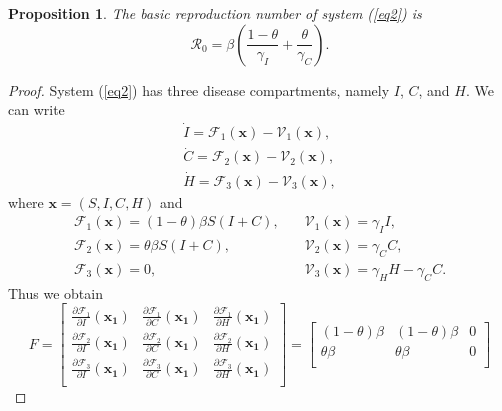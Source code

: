 \documentclass[11pt,reqno]{amsart}
\newtheorem{proposition}{Proposition}
\theoremstyle{boldremark}
\begin{document}
\begin{proposition} \label{prop1}
    The basic reproduction number of system (\ref{eq2}) is 
    \begin{equation*}
        \mathcal{R}_0=\beta\left(\frac{1-\theta}{\gamma_I}+\frac{\theta}{\gamma_C}\right). 
    \end{equation*}
\end{proposition}
\begin{proof}
    System (\ref{eq2}) has three disease compartments, namely $I$, $C$, and $H$. We can write 
    \begin{align*}
        \dot{I} = \mathcal{F}_1(\mathbf{x})-\mathcal{V}_1(\mathbf{x}), \\ 
        \dot{C} = \mathcal{F}_2(\mathbf{x})-\mathcal{V}_2(\mathbf{x}), \\ 
        \dot{H} = \mathcal{F}_3(\mathbf{x})-\mathcal{V}_3(\mathbf{x}),  
    \end{align*}
    where $\mathbf{x}=(S,I,C,H)$ and 
    \begin{align*}
        \mathcal{F}_1(\mathbf{x}) = (1-\theta)\beta S (I+C),& \quad \mathcal{V}_1(\mathbf{x})=\gamma_I I, \\ 
        \mathcal{F}_2(\mathbf{x}) = \theta\beta S (I+C),& \quad \mathcal{V}_2(\mathbf{x})=\gamma_C C, \\
        \mathcal{F}_3(\mathbf{x}) = 0,& \quad \mathcal{V}_3(\mathbf{x})=\gamma_H H - \gamma_C C. 
    \end{align*}
    Thus we obtain 
    \begin{equation*}
    F = 
    \begin{bmatrix}
    \frac{\partial \mathcal{F}_1}{\partial I} (\mathbf{x_1}) & \frac{\partial \mathcal{F}_1}{\partial C} (\mathbf{x_1})  & \frac{\partial \mathcal{F}_1}{\partial H} (\mathbf{x_1})\\
    \frac{\partial \mathcal{F}_2}{\partial I} (\mathbf{x_1}) & \frac{\partial \mathcal{F}_2}{\partial C} (\mathbf{x_1})  & \frac{\partial \mathcal{F}_2}{\partial H} (\mathbf{x_1})\\
    \frac{\partial \mathcal{F}_3}{\partial I} (\mathbf{x_1}) & \frac{\partial \mathcal{F}_3}{\partial C} (\mathbf{x_1})  & \frac{\partial \mathcal{F}_3}{\partial H} (\mathbf{x_1})\\
    \end{bmatrix}
    = 
    \begin{bmatrix}
        (1-\theta)\beta & (1-\theta) \beta & 0 \\ 
        \theta \beta & \theta \beta & 0 \\ 

\end{bmatrix}
\end{equation*}
\end{proof}
\end{document}
